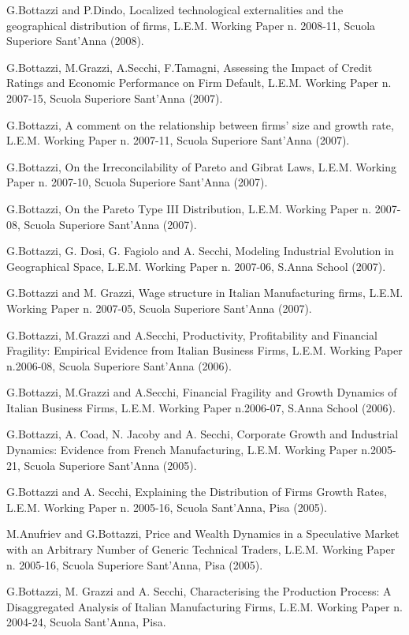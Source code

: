 \documentclass[a4paper]{article}
\begin{document}
G.Bottazzi and P.Dindo, Localized technological externalities and the
geographical distribution of firms, L.E.M.  Working Paper n. 2008-11,
Scuola Superiore Sant'Anna (2008).

G.Bottazzi, M.Grazzi, A.Secchi, F.Tamagni, Assessing the Impact of
Credit Ratings and Economic Performance on Firm Default,
L.E.M. Working Paper n. 2007-15, Scuola Superiore Sant'Anna (2007).

G.Bottazzi, A comment on the relationship between firms' size and
growth rate, L.E.M. Working Paper n. 2007-11, Scuola Superiore
Sant'Anna (2007).

G.Bottazzi, On the Irreconcilability of Pareto and Gibrat Laws,
L.E.M. Working Paper n. 2007-10, Scuola Superiore Sant'Anna (2007).

G.Bottazzi, On the Pareto Type III Distribution, L.E.M. Working Paper
n. 2007-08, Scuola Superiore Sant'Anna (2007).

G.Bottazzi, G. Dosi, G. Fagiolo and A. Secchi, Modeling Industrial
Evolution in Geographical Space, L.E.M. Working Paper n. 2007-06,
S.Anna School (2007).

G.Bottazzi and M. Grazzi, Wage structure in Italian Manufacturing
firms, L.E.M. Working Paper n. 2007-05, Scuola Superiore Sant'Anna
(2007).

G.Bottazzi, M.Grazzi and A.Secchi, Productivity, Profitability and
Financial Fragility: Empirical Evidence from Italian Business Firms,
L.E.M. Working Paper n.2006-08, Scuola Superiore Sant'Anna (2006).

G.Bottazzi, M.Grazzi and A.Secchi, Financial Fragility and Growth
Dynamics of Italian Business Firms, L.E.M. Working Paper n.2006-07,
S.Anna School (2006).

G.Bottazzi, A. Coad, N. Jacoby and A. Secchi, Corporate Growth and
Industrial Dynamics: Evidence from French Manufacturing,
L.E.M. Working Paper n.2005-21, Scuola Superiore Sant'Anna (2005).

G.Bottazzi and A. Secchi, Explaining the Distribution of Firms Growth
Rates, L.E.M. Working Paper n. 2005-16, Scuola Sant'Anna, Pisa (2005).

M.Anufriev and G.Bottazzi, Price and Wealth Dynamics in a Speculative
Market with an Arbitrary Number of Generic Technical Traders,
L.E.M. Working Paper n. 2005-16, Scuola Superiore Sant'Anna, Pisa
(2005).

G.Bottazzi, M. Grazzi and A. Secchi, Characterising the Production
Process: A Disaggregated Analysis of Italian Manufacturing Firms,
L.E.M. Working Paper n. 2004-24, Scuola Sant'Anna, Pisa.
\end{document}
